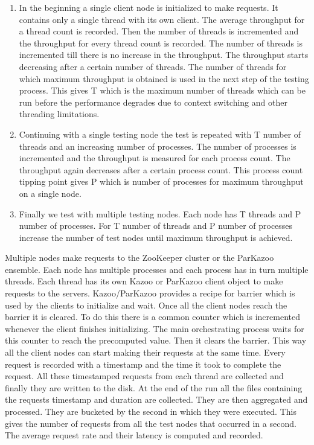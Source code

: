 \begin{enumerate}
	\item In the beginning a single client node is initialized to make requests. It contains only a single thread with its own client. The average throughput for a thread count is recorded. Then the number of threads is incremented and the throughput for every thread count is recorded. The number of threads is incremented till there is no increase in the throughput. The throughput starts decreasing after a certain number of threads. The number of threads for which maximum throughput is obtained is used in the next step of the testing process. This gives T which is the maximum number of threads which can be run before the performance degrades due to context switching and other threading limitations.
	\item Continuing with a single testing node the test is repeated with T number of threads and an increasing number of processes. The number of processes is incremented and the throughput is measured for each process count. The throughput again decreases after a certain process count. This process count tipping point gives P which is number of processes for maximum throughput on a single node.
	\item Finally we test with multiple testing nodes. Each node has T threads and P number of processes. For T number of threads and P number of processes increase the number of test nodes until maximum throughput is achieved.
\end{enumerate}

Multiple nodes make requests to the ZooKeeper cluster or the ParKazoo ensemble. Each node has multiple processes and each process has in turn multiple threads. Each thread has its own Kazoo or ParKazoo client object to make requests to the servers. Kazoo/ParKazoo provides a recipe for barrier which is used by the clients to initialize and wait. Once all the client nodes reach the barrier it is cleared. To do this there is a common counter which is incremented whenever the client finishes initializing. The main orchestrating process waits for this counter to reach the precomputed value. Then it clears the barrier. This way all the client nodes can start making their requests at the same time. Every request is recorded with a timestamp and the time it took to complete the request. All these timestamped requests from each thread are collected and finally they are written to the disk. At the end of the run all the files containing the requests timestamp and duration are collected. They are then aggregated and processed. They are bucketed by the second in which they were executed. This gives the number of requests from all the test nodes that occurred in a second. The average request rate and their latency is computed and recorded. 

